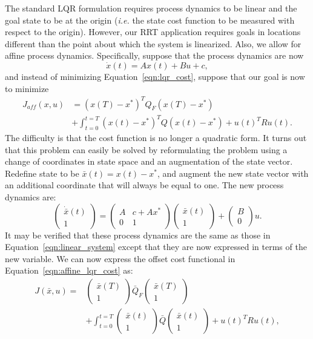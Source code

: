 The standard LQR formulation requires process dynamics to be linear
and the goal state to be at the origin ({\em i.e.} the state cost
function to be measured with respect to the origin). However, our RRT
application requires goals in locations different than the point about
which the system is linearized. Also, we allow for affine process
dynamics. Specifically, suppose that the process dynamics are now
\begin{equation}
\dot{x}(t) = A x(t) + B u + c,
\label{eqn:affine_dynamics}
\end{equation}
and instead of minimizing Equation~\ref{eqn:lqr_cost}, suppose that
our goal is now to minimize
\begin{align} \nonumber
J_{aff}(x,u) & = (x(T)-x^*)^T Q_F (x(T)-x^*) \\
& + \int_{t=0}^{t=T}
(x(t)-x^*)^T Q (x(t)-x^*) + u(t)^T R u(t).
\label{eqn:affine_lqr_cost}
\end{align}
The difficulty is that the cost function is no longer a quadratic
form. It turns out that this problem can easily be solved by
reformulating the problem using a change of coordinates in state space
and an augmentation of the state vector. Redefine state to be
$\bar{x}(t) = x(t) - x^*$, and augment the new state vector with an
additional coordinate that will always be equal to one. The new
process dynamics are:
\[
\left(
\begin{array}{c}
\dot{\bar{x}}(t) \\
1
\end{array}
\right)
=
\left(
\begin{array}{cc}
A & c + Ax^* \\
0 & 1
\end{array}
\right)
\left(
\begin{array}{c}
\bar{x}(t) \\
1
\end{array}
\right)
+ 
\left(
\begin{array}{c}
B \\
0
\end{array}
\right)
u.
\]
It may be verified that these process dynamics are the same as those
in Equation~\ref{eqn:linear_system} except that they are now expressed
in terms of the new variable. We can now express the offset cost
functional in Equation~\ref{eqn:affine_lqr_cost} as:
\begin{align} \nonumber
J(\bar{x},u) = & 
\left(
\begin{array}{c}
\bar{x}(T) \\
1
\end{array}
\right)
\bar{Q}_F
\left(
\begin{array}{c}
\bar{x}(T) \\
1
\end{array}
\right) \\
& + \int_{t=0}^{t=T}
\left(
\begin{array}{c}
\bar{x}(t) \\
1
\end{array}
\right)
\bar{Q}
\left(
\begin{array}{c}
\bar{x}(t) \\
1
\end{array}
\right)
+ u(t)^T R u(t),
\label{eqn:affine_lqr_cost}
\end{align}
